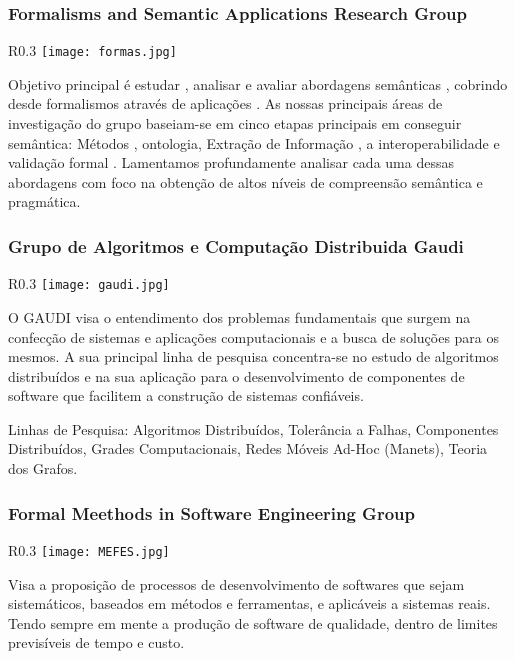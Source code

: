 \subsubsection{Formalisms and Semantic Applications Research Group}
\begin{wrapfigure}{R}{0.3\textwidth}
            \centering
            \texttt{[image: formas.jpg]}
        \end{wrapfigure}
Objetivo principal é estudar , analisar e avaliar abordagens semânticas , cobrindo desde formalismos através de aplicações . As nossas principais áreas de investigação do grupo baseiam-se em cinco etapas principais em conseguir semântica: Métodos , ontologia, Extração de Informação , a interoperabilidade e validação formal . Lamentamos profundamente analisar cada uma dessas abordagens com foco na obtenção de altos níveis de compreensão semântica e pragmática.


\subsubsection{Grupo de Algoritmos e Computação Distribuida Gaudi}
\begin{wrapfigure}{R}{0.3\textwidth}
            \centering
            \texttt{[image: gaudi.jpg]}
        \end{wrapfigure}

O GAUDI visa o entendimento dos problemas fundamentais que surgem na confecção de sistemas e aplicações computacionais e a busca de soluções para os mesmos. A sua principal linha de pesquisa concentra-se no estudo de algoritmos distribuídos e na sua aplicação para o desenvolvimento de componentes de software que facilitem a construção de sistemas confiáveis. 

Linhas de Pesquisa: Algoritmos Distribuídos, Tolerância a Falhas, Componentes Distribuídos, Grades Computacionais, Redes Móveis Ad-Hoc (Manets), Teoria dos Grafos.

\subsubsection{Formal Meethods in Software Engineering Group}
\begin{wrapfigure}{R}{0.3\textwidth}
            \centering
            \texttt{[image: MEFES.jpg]}
        \end{wrapfigure}
Visa a proposição de processos de desenvolvimento de softwares que sejam sistemáticos, baseados em métodos e ferramentas, e aplicáveis a sistemas reais. Tendo sempre em mente a produção de software de qualidade, dentro de limites previsíveis de tempo e custo.


